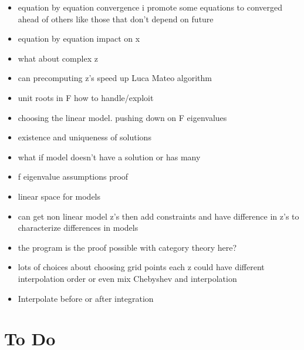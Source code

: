 \documentclass[12pt]{article}
\begin{document}
\begin{description}
  \begin{itemize}
  \item equation by equation convergence i promote some equations to converged ahead of others like those that don't depend on future
  \item equation by equation impact on x
  \item what about complex z
  \item can precomputing z's speed up Luca Mateo algorithm
  \item unit roots in F how to handle/exploit
  \item choosing the linear model.  pushing down on F eigenvalues
  \item existence and uniqueness of solutions
\item what if model doesn't have a solution or has many
\item f eigenvalue assumptions proof
\item linear space for models
\item can get non linear model z's then add constraints and have difference in z's to characterize differences in models
\item the program is the proof possible with category theory here?
\item lots of choices about choosing grid points each z could have different interpolation order or even mix Chebyshev and interpolation
\item Interpolate before or after integration
  \end{itemize}
\end{description}









  






\appendix
\newpage

\section{To Do}
\label{sec:do}
\end{document}
